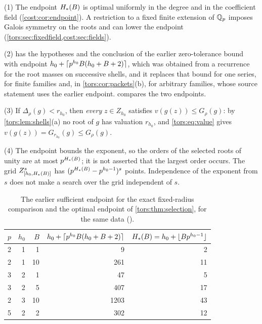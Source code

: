 \begin{remark}\label{tors:rem:recovered}
(1) The endpoint $H_{*}(B)$ is optimal uniformly in the degree and in the coefficient
field (\cref{cost:cor:endpoint}). A restriction to a fixed finite extension of $\mathbb{Q}_p$ imposes
Galois symmetry on the roots and can lower the endpoint
(\cref{tors:sec:fixedfield,cost:sec:fields}).

(2)  has the hypotheses and the conclusion of the earlier
zero-tolerance bound with endpoint $h_0+\lceil p^{h_0}B(h_0+B+2)\rceil$, which was obtained from
a recurrence for the root masses on successive shells, and it replaces that bound for one
series, for finite families and, in \cref{tors:cor:packets}\textup{(b)}, for arbitrary
families, whose source statement uses the earlier endpoint.
 compares the two endpoints.

(3) If $\Delta_\rho(g)<r_{h_0}$, then \emph{every} $z\in Z_{h_0}$ satisfies
$v(g(z))\le G_\rho(g)$: by \cref{tors:lem:shells}(a) no root of $g$ has valuation
$r_{h_0}$, and \eqref{tors:eq:value} gives $v(g(z))=G_{r_{h_0}}(g)\le G_\rho(g)$.

(4) The endpoint bounds the exponent, so the orders of the selected roots of unity are at
most $p^{H_{*}(B)}$; it is not asserted that the largest order occurs. The grid
$Z_{[h_0,H_{*}(B)]}^s$ has $(p^{H_{*}(B)}-p^{h_0-1})^s$ points. Independence of the
exponent from $s$ does not make a search over the grid independent of $s$.
\end{remark}

\begin{table}[ht]
\centering\small
\begin{tabular}{@{}rrrrr@{}}
\toprule
$p$ & $h_0$ & $B$ & $h_0+\lceil p^{h_0}B(h_0+B+2)\rceil$ & $H_{*}(B)=h_0+\lfloor Bp^{h_0-1}\rfloor$\\
\midrule
2&1&1&9&2\\
2&1&10&261&11\\
3&2&1&47&5\\
3&2&5&407&17\\
2&3&10&1203&43\\
5&2&2&302&12\\
\bottomrule
\end{tabular}
\caption{The earlier sufficient endpoint for the exact fixed-radius comparison and the
optimal endpoint of \cref{tors:thm:selection}, for the same data
().}
\label{tors:tab:endpoints}
\end{table}

